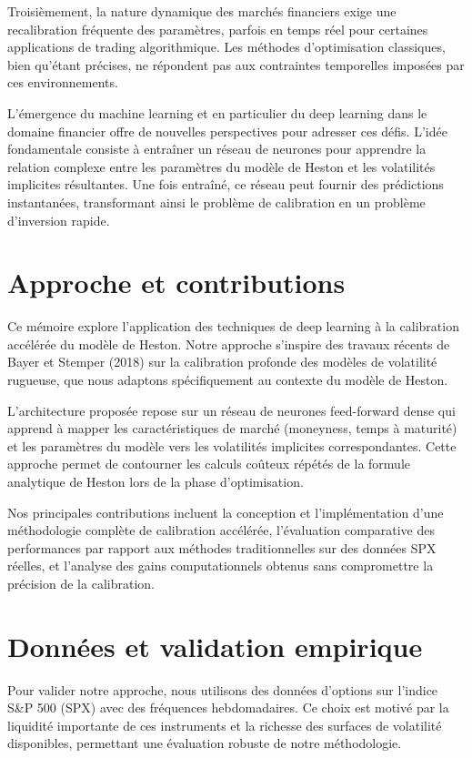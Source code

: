 Troisièmement, la nature dynamique des marchés financiers exige une recalibration fréquente des paramètres, parfois en temps réel pour certaines applications de trading algorithmique. Les méthodes d'optimisation classiques, bien qu'étant précises, ne répondent pas aux contraintes temporelles imposées par ces environnements.

L'émergence du machine learning et en particulier du deep learning dans le domaine financier offre de nouvelles perspectives pour adresser ces défis. L'idée fondamentale consiste à entraîner un réseau de neurones pour apprendre la relation complexe entre les paramètres du modèle de Heston et les volatilités implicites résultantes. Une fois entraîné, ce réseau peut fournir des prédictions instantanées, transformant ainsi le problème de calibration en un problème d'inversion rapide.

\section{Approche et contributions}

Ce mémoire explore l'application des techniques de deep learning à la calibration accélérée du modèle de Heston. Notre approche s'inspire des travaux récents de Bayer et Stemper (2018) sur la calibration profonde des modèles de volatilité rugueuse, que nous adaptons spécifiquement au contexte du modèle de Heston.

L'architecture proposée repose sur un réseau de neurones feed-forward dense qui apprend à mapper les caractéristiques de marché (moneyness, temps à maturité) et les paramètres du modèle vers les volatilités implicites correspondantes. Cette approche permet de contourner les calculs coûteux répétés de la formule analytique de Heston lors de la phase d'optimisation.

Nos principales contributions incluent la conception et l'implémentation d'une méthodologie complète de calibration accélérée, l'évaluation comparative des performances par rapport aux méthodes traditionnelles sur des données SPX réelles, et l'analyse des gains computationnels obtenus sans compromettre la précision de la calibration.

\section{Données et validation empirique}

Pour valider notre approche, nous utilisons des données d'options sur l'indice S\&P 500 (SPX) avec des fréquences hebdomadaires. Ce choix est motivé par la liquidité importante de ces instruments et la richesse des surfaces de volatilité disponibles, permettant une évaluation robuste de notre méthodologie.

